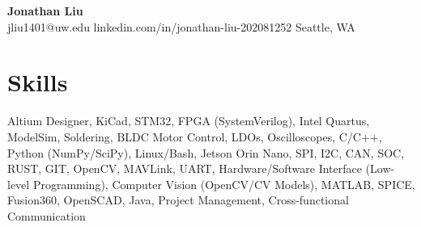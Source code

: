 \documentclass[11pt,letterpaper]{article}
\begin{document}
\begin{center}
{\LARGE \textbf{Jonathan Liu}}\\[2pt]
\small jliu1401@uw.edu \textbullet{} linkedin.com/in/jonathan-liu-202081252 \textbullet{} Seattle, WA
\end{center}
\section*{Skills}
Altium Designer, KiCad, STM32, FPGA (SystemVerilog), Intel Quartus, ModelSim, Soldering, BLDC Motor Control, LDOs, Oscilloscopes, C/C++, Python (NumPy/SciPy), Linux/Bash, Jetson Orin Nano, SPI, I2C, CAN, SOC, RUST, GIT, OpenCV, MAVLink, UART, Hardware/Software Interface (Low-level Programming), Computer Vision (OpenCV/CV Models), MATLAB, SPICE, Fusion360, OpenSCAD, Java, Project Management, Cross-functional Communication
\end{document}

